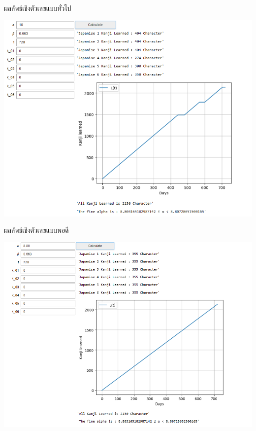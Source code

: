 \documentclass{beamer}
\begin{document}
\begin{frame}{ผลลัพธ์เชิงตัวเลขแบบทั่วไป} 
\begin{center}
\includegraphics[scale = 0.3]{3.png}
\end{center}
\end{frame}

\begin{frame}{ผลลัพธ์เชิงตัวเลขแบบพอดี} 
\begin{center}
\includegraphics[scale = 0.3]{4.png}
\end{center}
\end{frame}
\end{document}
